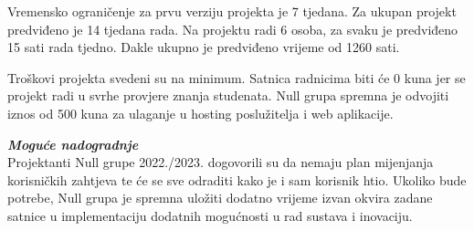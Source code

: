 \texttt{}{
Vremensko ograničenje za prvu verziju projekta je 7 tjedana. Za ukupan projekt predviđeno je 14 tjedana rada. Na projektu radi 6 osoba, za svaku je predviđeno 15 sati rada tjedno. Dakle ukupno je predviđeno vrijeme od 1260 sati. 
}
\newline


\texttt{}{
Troškovi projekta svedeni su na minimum. Satnica radnicima biti će 0 kuna jer se projekt radi u svrhe provjere znanja studenata. Null grupa spremna je odvojiti iznos od 500 kuna za ulaganje u hosting poslužitelja i web aplikacije.
}\newline



              \textbf{\textit{Moguće nadogradnje}}\\

\texttt{}{
Projektanti Null grupe 2022./2023. dogovorili su da nemaju plan mijenjanja korisničkih zahtjeva te će se sve odraditi kako je i sam korisnik htio. Ukoliko bude potrebe, Null grupa je spremna uložiti dodatno vrijeme izvan okvira zadane satnice u implementaciju dodatnih mogućnosti u rad sustava i inovaciju. 
}



        
		

		
		
		


		
				
